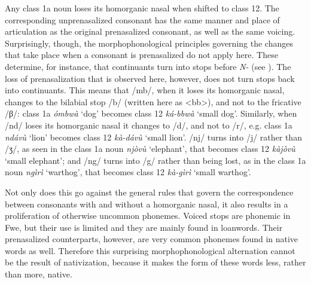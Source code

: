 Any class 1a noun loses its homorganic nasal when shifted to class 12. The corresponding unprenasalized consonant has the same manner and place of articulation as the original prenasalized consonant, as well as the same voicing. Surprisingly, though, the morphophonological principles governing the changes that take place when a consonant is prenasalized do not apply here. These determine, for instance, that continuants turn into stops before \textit{N-} (see ). The loss of prenasalization that is observed here, however, does not turn stops back into continuants. This means that /mb/, when it loses its homorganic nasal, changes to the bilabial stop /b/ (written here as <bb>), and not to the fricative /β/: class 1a \textit{ómbwà} ‘dog’ becomes class 12 \textit{ká-bbwà} ‘small dog’. Similarly, when /nd/ loses its homorganic nasal it changes to /d/, and not to /r/, e.g. class 1a \textit{ndávù} ‘lion’ becomes class 12 \textit{kà-dávù} ‘small lion’. /nj/ turns into /j/ rather than /ʒ/, as seen in the class 1a noun \textit{njòvù} ‘elephant’, that becomes class 12 \textit{kàjòvù} ‘small elephant’; and /ng/ turns into /g/ rather than being lost, as in the class 1a noun \textit{ngìrì} ‘warthog’, that becomes class 12 \textit{kà-gìrì} ‘small warthog’.

Not only does this go against the general rules that govern the correspondence between consonants with and without a homorganic nasal, it also results in a proliferation of otherwise uncommon phonemes. Voiced stops are phonemic in Fwe, but their use is limited and they are mainly found in loanwords. Their prenasalized counterparts, however, are very common phonemes found in native words as well. Therefore this surprising morphophonological alternation cannot be the result of nativization, because it makes the form of these words less, rather than more, native.

